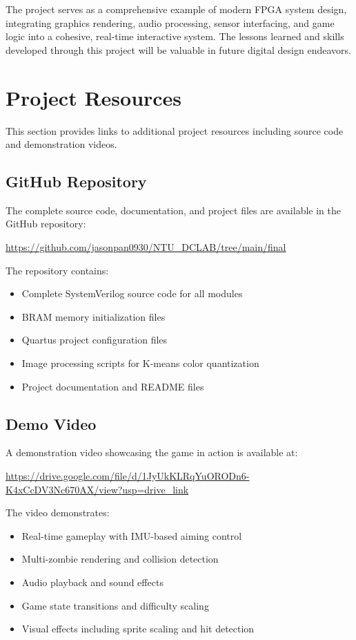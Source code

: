 \documentclass[12pt,a4paper]{article}
\begin{document}
The project serves as a comprehensive example of modern FPGA system design, integrating graphics rendering, audio processing, sensor interfacing, and game logic into a cohesive, real-time interactive system. The lessons learned and skills developed through this project will be valuable in future digital design endeavors.

\newpage
\appendix

\section{Project Resources}

This section provides links to additional project resources including source code and demonstration videos.

\subsection{GitHub Repository}

The complete source code, documentation, and project files are available in the GitHub repository:

\url{https://github.com/jasonpan0930/NTU_DCLAB/tree/main/final}

The repository contains:
\begin{itemize}
    \item Complete SystemVerilog source code for all modules
    \item BRAM memory initialization files
    \item Quartus project configuration files
    \item Image processing scripts for K-means color quantization
    \item Project documentation and README files
\end{itemize}

\subsection{Demo Video}

A demonstration video showcasing the game in action is available at:

\url{https://drive.google.com/file/d/1JyUkKLRqYuORODn6-K4xCcDV3Nc670AX/view?usp=drive_link}

The video demonstrates:
\begin{itemize}
    \item Real-time gameplay with IMU-based aiming control
    \item Multi-zombie rendering and collision detection
    \item Audio playback and sound effects
    \item Game state transitions and difficulty scaling
    \item Visual effects including sprite scaling and hit detection
\end{itemize}
\end{document}
